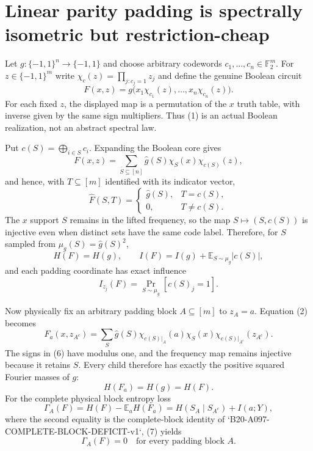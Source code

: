 \section*{Linear parity padding is spectrally isometric but restriction-cheap}

Let $g:\{-1,1\}^n\to\{-1,1\}$ and choose arbitrary codewords
$c_1,\ldots,c_n\in\mathbb F_2^m$.  For
$z\in\{-1,1\}^m$ write
$\chi_c(z)=\prod_{j:c_j=1}z_j$ and define the genuine Boolean circuit
\[
 F(x,z)=g\bigl(x_1\chi_{c_1}(z),\ldots,
                 x_n\chi_{c_n}(z)\bigr).                 \tag{1}
\]
For each fixed $z$, the displayed map is a permutation of the $x$ truth
table, with inverse given by the same sign multipliers.  Thus (1) is an
actual Boolean realization, not an abstract spectral law.

Put $c(S)=\bigoplus_{i\in S}c_i$.  Expanding the Boolean core gives
\[
 F(x,z)=\sum_{S\subseteq[n]}\widehat g(S)\chi_S(x)
                         \chi_{c(S)}(z),                 \tag{2}
\]
and hence, with $T\subseteq[m]$ identified with its indicator vector,
\[
 \widehat F(S,T)=
 \begin{cases}
   \widehat g(S),&T=c(S),\\
   0,&T\ne c(S).
 \end{cases}                                             \tag{3}
\]
The $x$ support $S$ remains in the lifted frequency, so the map
$S\mapsto(S,c(S))$ is injective even when distinct sets have the same code
label.  Therefore, for $S$ sampled from
$\mu_g(S)=\widehat g(S)^2$,
\[
 H(F)=H(g),\qquad
 I(F)=I(g)+\mathbb E_{S\sim\mu_g}|c(S)|,                 \tag{4}
\]
and each padding coordinate has exact influence
\[
 I_{z_j}(F)=\Pr_{S\sim\mu_g}[c(S)_j=1].                 \tag{5}
\]

Now physically fix an arbitrary padding block $A\subseteq[m]$ to
$z_A=a$.  Equation (2) becomes
\[
 F_a(x,z_{A^c})=
 \sum_S \widehat g(S)\chi_{c(S)|_A}(a)\chi_S(x)
                    \chi_{c(S)|_{A^c}}(z_{A^c}).         \tag{6}
\]
The signs in (6) have modulus one, and the frequency map remains injective
because it retains $S$.  Every child therefore has exactly the positive
squared Fourier masses of $g$:
\[
 H(F_a)=H(g)=H(F).                                      \tag{7}
\]
For the complete physical block entropy loss
\[
 \Gamma_A(F)=H(F)-\mathbb E_aH(F_a)
             =H(S_A\mid S_{A^c})+I(a;Y),
\]
where the second equality is the complete-block identity of
`B20-A097-COMPLETE-BLOCK-DEFICIT-v1`, (7) yields
\[
 \boxed{\Gamma_A(F)=0\quad\text{for every padding block }A.} \tag{8}
\]

